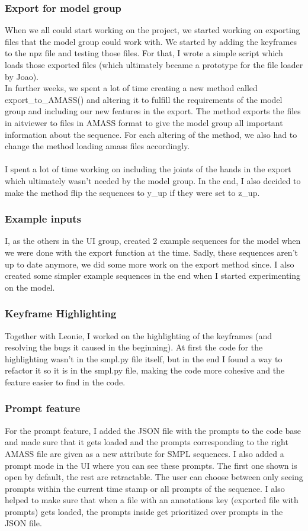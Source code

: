 \documentclass[a4paper]{scrartcl}
\begin{document}
\subsubsection*{Export for model group}
When we all could start working on the project, we started working on exporting files that the model group could work with. We started by adding the keyframes to the npz file and testing those files. For that, I wrote a simple script which loads those exported files (which ultimately became a prototype for the file loader by Joao).\\
In further weeks, we spent a lot of time creating a new method called export\_to\_AMASS() and altering it to fulfill the requirements of the model group and including our new features in the export. The method exports the files in aitviewer to files in AMASS format to give the model group all important information about the sequence. For each altering of the method, we also had to change the method loading amass files accordingly.\\\\
I spent a lot of time working on including the joints of the hands in the export which ultimately wasn't needed by the model group. In the end, I also decided to make the method flip the sequences to y\_up if they were set to z\_up.

\subsubsection*{Example inputs}
I, as the others in the UI group, created 2 example sequences for the model when we were done with the export function at the time. Sadly, these sequences aren't up to date anymore, we did some more work on the export method since. I also created some simpler example sequences in the end when I started experimenting on the model.

\subsubsection*{Keyframe Highlighting}
Together with Leonie, I worked on the highlighting of the keyframes (and resolving the bugs it caused in the beginning). At first the code for the highlighting wasn't in the smpl.py file itself, but in the end I found a way to refactor it so it is in the smpl.py file, making the code more cohesive and the feature easier to find in the code.

\subsubsection*{Prompt feature}
For the prompt feature, I added the JSON file with the prompts to the code base and made sure that it gets loaded and the prompts corresponding to the right AMASS file are given as a new attribute for SMPL sequences. I also added a prompt mode in the UI where you can see these prompts. The first one shown is open by default, the rest are retractable. The user can choose between only seeing prompts within the current time stamp or all prompts of the sequence. I also helped to make sure that when a file with an annotations key (exported file with prompts) gets loaded, the prompts inside get prioritized over prompts in the JSON file.
\end{document}
